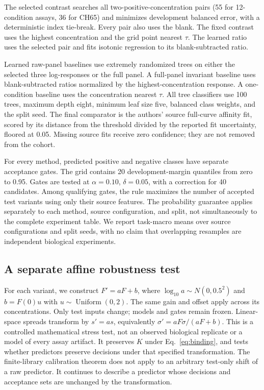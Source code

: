 \documentclass[11pt,letterpaper]{article}
\begin{document}
The selected contrast searches all two-positive-concentration pairs (55 for 12-condition assays, 36 for CH65) and minimizes development balanced error, with a deterministic index tie-break. Every pair also uses the blank. The fixed contrast uses the highest concentration and the grid point nearest $\tau$. The learned ratio uses the selected pair and fits isotonic regression to its blank-subtracted ratio.

Learned raw-panel baselines use extremely randomized trees on either the selected three log-responses or the full panel. A full-panel invariant baseline uses blank-subtracted ratios normalized by the highest-concentration response. A one-condition baseline uses the concentration nearest $\tau$. All tree classifiers use 100 trees, maximum depth eight, minimum leaf size five, balanced class weights, and the split seed. The final comparator is the authors' source full-curve affinity fit, scored by its distance from the threshold divided by the reported fit uncertainty, floored at 0.05. Missing source fits receive zero confidence; they are not removed from the cohort.

For every method, predicted positive and negative classes have separate acceptance gates. The grid contains 20 development-margin quantiles from zero to 0.95. Gates are tested at $\alpha=0.10$, $\delta=0.05$, with a correction for 40 candidates. Among qualifying gates, the rule maximizes the number of accepted test variants using only their source features. The probability guarantee applies separately to each method, source configuration, and split, not simultaneously to the complete experiment table. We report task-macro means over source configurations and split seeds, with no claim that overlapping resamples are independent biological experiments.

\subsection{A separate affine robustness test}
For each variant, we construct $F'=aF+b$, where $\log_{10}a\sim N(0,0.5^2)$ and $b=F(0)u$ with $u\sim\operatorname{Uniform}(0,2)$. The same gain and offset apply across its concentrations. Only test inputs change; models and gates remain frozen. Linear-space spreads transform by $s'=as$, equivalently $\sigma'=aF\sigma/(aF+b)$. This is a controlled mathematical stress test, not an observed biological replicate or a model of every assay artifact. It preserves $K$ under Eq.~\eqref{eq:binding}, and tests whether predictors preserve decisions under that specified transformation. The finite-library calibration theorem does not apply to an arbitrary test-only shift of a raw predictor. It continues to describe a predictor whose decisions and acceptance sets are unchanged by the transformation.
\end{document}
